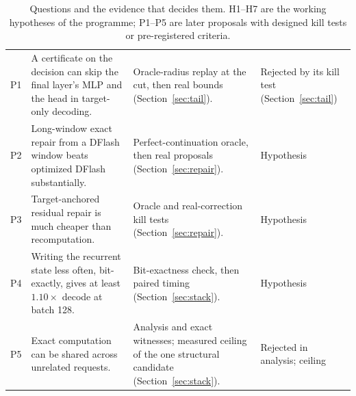 \begin{table}[tbp]
\begin{tabularx}{\linewidth}{@{}P{.6cm}YP{3.7cm}P{3.1cm}@{}}
P1 & A certificate on the decision can skip the final layer's MLP and the head in target-only decoding. & Oracle-radius replay at the cut, then real bounds (Section~\ref{sec:tail}). & Rejected by its kill test (Section~\ref{sec:tail})\\
P2 & Long-window exact repair from a DFlash window beats optimized DFlash substantially. & Perfect-continuation oracle, then real proposals (Section~\ref{sec:repair}). & Hypothesis \\
P3 & Target-anchored residual repair is much cheaper than recomputation. & Oracle and real-correction kill tests (Section~\ref{sec:repair}). & Hypothesis \\
P4 & Writing the recurrent state less often, bit-exactly, gives at least $1.10\times$ decode at batch 128. & Bit-exactness check, then paired timing (Section~\ref{sec:stack}). & Hypothesis \\
P5 & Exact computation can be shared across unrelated requests. & Analysis and exact witnesses; measured ceiling of the one structural candidate (Section~\ref{sec:stack}). & Rejected in analysis; ceiling \\\bottomrule
\end{tabularx}
\caption{Questions and the evidence that decides them. H1--H7 are the working hypotheses of the programme; P1--P5 are later proposals with designed kill tests or pre-registered criteria.}
\label{tab:hypotheses}
\end{table}

